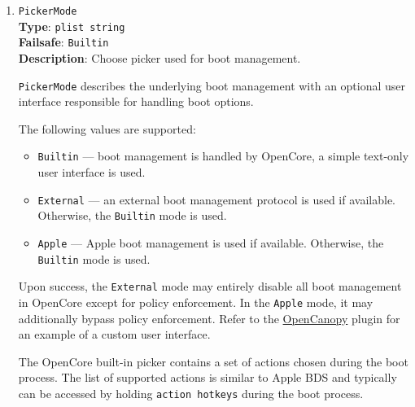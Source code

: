 \documentclass[]{article}
\providecommand{\tightlist}{%
  \setlength{\itemsep}{0pt}\setlength{\parskip}{0pt}}
\begin{document}
\begin{enumerate}
  For the macOS bootloader, screen reader preference is set in the \texttt{preferences.efires}
  archive in the \texttt{isVOEnabled.int32} file and is controlled by the operating system.
  For OpenCore screen reader support, this option is an independent equivalent.
  Toggling screen reader support in both the OpenCore picker and the macOS bootloader
  FileVault 2 login window can also be done by using the \texttt{Command} + \texttt{F5} key
  combination.

  \emph{Note}: The screen reader requires working audio support. Refer to the
  \hyperref[uefiaudioprops]{\texttt{UEFI Audio Properties}} section for details.

\item
  \texttt{PickerMode}\\
  \textbf{Type}: \texttt{plist\ string}\\
  \textbf{Failsafe}: \texttt{Builtin}\\
  \textbf{Description}: Choose picker used for boot management.

  \texttt{PickerMode} describes the underlying boot management with
  an optional user interface responsible for handling boot options.

  The following values are supported:

  \begin{itemize}
  \tightlist
  \item \texttt{Builtin} --- boot management is handled by OpenCore, a simple
  text-only user interface is used.
  \item \texttt{External} --- an external boot management protocol is used
  if available. Otherwise, the \texttt{Builtin} mode is used.
  \item \texttt{Apple} --- Apple boot management is used if available.
  Otherwise, the \texttt{Builtin} mode is used.
  \end{itemize}

  Upon success, the \texttt{External} mode may entirely disable all boot management
  in OpenCore except for policy enforcement. In the \texttt{Apple} mode, it may
  additionally bypass policy enforcement. Refer to the \hyperref[ueficanopy]{OpenCanopy}
  plugin for an example of a custom user interface.

  The OpenCore built-in picker contains a set of actions chosen during the boot process.
  The list of supported actions is similar to Apple BDS and typically can be accessed by
  holding \texttt{action hotkeys} during the boot process.


\end{enumerate}
\end{document}
